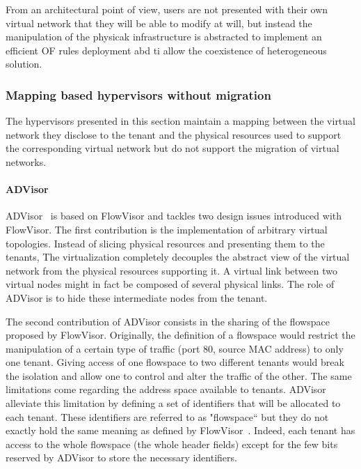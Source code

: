 From an architectural point of view, users are not presented with their own virtual network that they will be able to modify at will, but instead the manipulation of the physicak infrastructure is abstracted to implement an efficient OF rules deployment abd ti allow the coexistence of heterogeneous solution.


\subsubsection{Mapping based hypervisors without migration}
The hypervisors presented in this section maintain a mapping between the virtual network they disclose to the tenant and the physical resources used to support the corresponding virtual network but do not support the migration of virtual networks.

\paragraph{ADVisor}
ADVisor~\cite{ADVisor-Salvadori2012} is based on FlowVisor and tackles two design issues introduced with FlowVisor.
The first contribution is the implementation of arbitrary virtual topologies.
Instead of slicing physical resources and presenting them to the tenants, 
The virtualization completely decouples the abstract view of the virtual network from the physical resources supporting it.
A virtual link between two virtual nodes might in fact be composed of several physical links. The role of ADVisor is to hide these intermediate nodes from the tenant.

The second contribution of ADVisor consists in the sharing of the flowspace proposed by FlowVisor.
Originally, the definition of a flowspace would restrict the manipulation of a certain type of traffic (\eg port 80, source MAC address) to only one tenant.
Giving access of one flowspace to two different tenants would break the isolation and allow one to control and alter the traffic of the other.
The same limitations come regarding the address space available to tenants.
ADVisor alleviate this limitation by defining a set of identifiers that will be allocated to each tenant. These identifiers are referred to as "flowspace`` but they do not exactly hold the same meaning as defined by FlowVisor~\cite{FlowVisor-Sherwood2009}. Indeed, each tenant has access to the whole flowspace (\ie the whole header fields) except for the few bits reserved by ADVisor to store the necessary identifiers.

